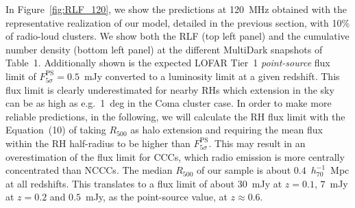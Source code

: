 \documentclass[traditabstract]{aa}
\newcommand{\rmn}{\mathrm}
\begin{document}
In Figure~\ref{fig:RLF_120}, we show the predictions at 120~MHz obtained with the representative realization of our model, detailed in the previous section, with 10\% of radio-loud clusters. We show both the RLF (top left panel) and the cumulative number density (bottom left panel) at the different MultiDark snapshots of Table~1. Additionally shown is the expected LOFAR Tier~1 \emph{point-source} flux limit of $F_{5\sigma}^{\rmn{PS}}=0.5$~mJy \citep{2012JApA..tmp...34R} converted to a luminosity limit at a given redshift. This flux limit is clearly underestimated for nearby RHs which extension in the sky can be as high as e.g.~1~deg in the Coma cluster case. In order to make more reliable predictions, in the following, we will calculate the RH flux limit with the Equation~(10) of \cite{2010A&A...509A..68C} taking $R_{500}$ as halo extension and requiring the mean flux within the RH half-radius to be higher than $F_{5\sigma}^{\rmn{PS}}$. This may result in an overestimation of the flux limit for CCCs, which radio emission is more centrally concentrated than NCCCs. The median $R_{500}$ of our sample is about $0.4$~$h_{70}^{-1}$~Mpc at all redshifts. This translates to a flux limit of about $30$~mJy at $z = 0.1$, $7$~mJy at $z = 0.2$ and $0.5$~mJy, as the point-source value, at $z \approx 0.6$.   
\end{document}
